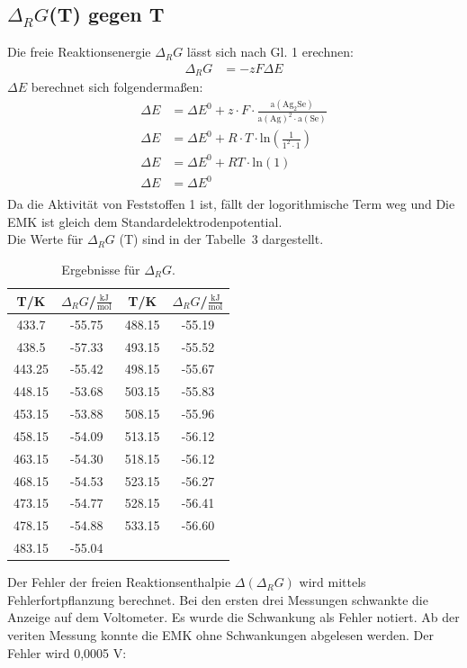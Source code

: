 \documentclass[12pt,a4paper,titlepage,headinclude,bibtotoc]{scrartcl}
\begin{document}
\subsection{$\Delta_R G$(T) gegen T}
Die freie Reaktionsenergie $\Delta_R G$ lässt sich nach Gl. 1 erechnen:
\begin{align}
\Delta_R G &= - z F \Delta E 
\end{align}
$\Delta E$ berechnet sich folgendermaßen:
\begin{align}
\Delta E &= \Delta E^0 + z\cdot F \cdot \frac{\text{a}(\text{Ag}_2\text{Se})}{\text{a}(\text{Ag})^2\cdot\text{a}(\text{Se})}\\
\Delta E &= \Delta E^0 + R\cdot T\cdot \text{ln}(\frac{1}{1^2\cdot1})\\
\Delta E &= \Delta E^0 + RT \cdot \text{ln}(1)\\
\Delta E &= \Delta E^0 \\
\end{align}
Da die Aktivität von Feststoffen 1 ist, fällt der logorithmische Term weg und Die EMK ist gleich dem Standardelektrodenpotential.\\
Die Werte für $\Delta_R G$ (T) sind in der Tabelle~3 dargestellt.
\begin{table}[h!]
\centering
\caption{Ergebnisse für $\Delta_R G$.}
\begin{tabular}{c|c||c|c}
T/\;K & $\Delta_R G$/\;$\frac{\text{kJ}}{\text{mol}}$ &T/\;K & $\Delta_R G$/\;$\frac{\text{kJ}}{\text{mol}}$\\ 
\hline
433.7 & -55.75 &488.15 & -55.19 \\ 
438.5 & -57.33 & 493.15& -55.52 \\
443.25 & -55.42 &  498.15& -55.67\\
448.15 & -53.68 & 503.15&  -55.83\\
453.15 & -53.88 & 508.15 & -55.96\\
458.15 & -54.09 & 513.15 & -56.12\\
463.15 & -54.30 & 518.15 & -56.12\\
468.15 & -54.53 & 523.15& -56.27\\
473.15 & -54.77 & 528.15 & -56.41\\
478.15 & -54.88 & 533.15& -56.60\\
483.15 & -55.04 &&\\
\end{tabular} 
\end{table}
\FloatBarrier
Der Fehler der freien Reaktionsenthalpie $\Delta(\Delta_R G)$  wird mittels Fehlerfortpflanzung berechnet. Bei den ersten drei Messungen schwankte die Anzeige auf dem Voltometer. Es wurde die Schwankung als Fehler notiert. Ab der veriten Messung konnte die EMK ohne Schwankungen abgelesen werden. Der Fehler wird 0,0005 V:
\end{document}
